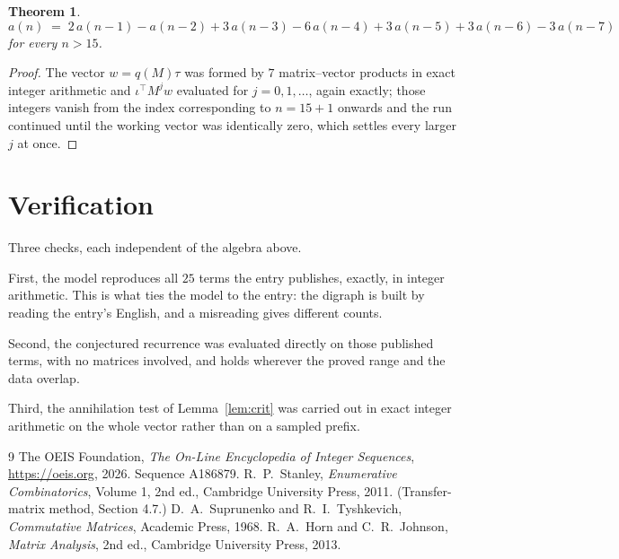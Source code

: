 \documentclass[11pt,a4paper]{article}
\theoremstyle{plain}
\newtheorem{theorem}{Theorem}
\theoremstyle{definition}
\begin{document}
\begin{theorem}
\[
a(n)\;=\;2\,a(n-1) - a(n-2) + 3\,a(n-3) - 6\,a(n-4) + 3\,a(n-5) + 3\,a(n-6) - 3\,a(n-7)
\]
for every $n>15$.
\end{theorem}

\begin{proof}
The vector $w=q(M)\tau$ was formed by $7$ matrix--vector products in exact integer
arithmetic and $\iota^{\!\top}M^{j}w$ evaluated for $j=0,1,\dots$, again exactly; those
integers vanish from the index corresponding to $n=15+1$ onwards and the run continued
until the working vector was identically zero, which settles every larger $j$ at once.
\end{proof}

\section{Verification}

Three checks, each independent of the algebra above.

First, the model reproduces all $25$ terms the entry publishes, exactly, in integer
arithmetic. This is what ties the model to the entry: the digraph is built by reading the
entry's English, and a misreading gives different counts.

Second, the conjectured recurrence was evaluated directly on those published terms, with no
matrices involved, and holds wherever the proved range and the data overlap.

Third, the annihilation test of Lemma~\ref{lem:crit} was carried out in exact integer
arithmetic on the whole vector rather than on a sampled prefix.

\begin{thebibliography}{9}
 The OEIS Foundation, \emph{The On-Line Encyclopedia of Integer
Sequences}, \url{https://oeis.org}, 2026. Sequence A186879.
 R.~P.~Stanley, \emph{Enumerative Combinatorics}, Volume 1, 2nd ed.,
Cambridge University Press, 2011. (Transfer-matrix method, Section 4.7.)
 D.~A.~Suprunenko and R.~I.~Tyshkevich, \emph{Commutative Matrices},
Academic Press, 1968.
 R.~A.~Horn and C.~R.~Johnson, \emph{Matrix Analysis}, 2nd ed., Cambridge
University Press, 2013.
\end{thebibliography}
\end{document}
